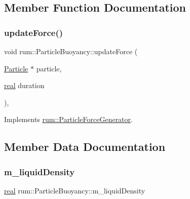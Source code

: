 \subsection{Member Function Documentation}
\mbox{\label{classrum_1_1_particle_buoyancy_a192992c47ce2b47fd06d0224e0cf86f4}} 
\subsubsection{\texorpdfstring{update\+Force()}{updateForce()}}
{\footnotesize\ttfamily void rum\+::\+Particle\+Buoyancy\+::update\+Force (\begin{DoxyParamCaption}\item[{\mbox{\hyperlink{classrum_1_1_particle}{Particle}} $\ast$}]{particle,  }\item[{\mbox{\hyperlink{namespacerum_a7e8cca23573d5eaead0f138cbaa4862c}{real}}}]{duration }\end{DoxyParamCaption})\hspace{0.3cm}{\ttfamily [override]}, {\ttfamily [virtual]}}



Implements \mbox{\hyperlink{classrum_1_1_particle_force_generator_af7abcafb9527220988ec4b9dde817b34}{rum\+::\+Particle\+Force\+Generator}}.



\subsection{Member Data Documentation}
\mbox{\label{classrum_1_1_particle_buoyancy_a8e347c9390d2eb5e4340f6e3c9d8d332}} 
\subsubsection{\texorpdfstring{m\+\_\+liquid\+Density}{m\_liquidDensity}}
{\footnotesize\ttfamily \mbox{\hyperlink{namespacerum_a7e8cca23573d5eaead0f138cbaa4862c}{real}} rum\+::\+Particle\+Buoyancy\+::m\+\_\+liquid\+Density\hspace{0.3cm}{\ttfamily [protected]}}

